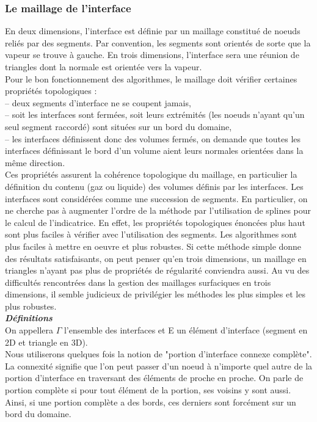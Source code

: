 \subsubsection{Le maillage de l'interface}
En deux dimensions, l’interface est d\'efinie par un maillage constitu\'e de noeuds reli\'es par des segments. Par convention, les segments sont orient\'es de sorte que la vapeur se trouve \`a gauche. En trois dimensions, l’interface sera une r\'eunion de triangles dont la normale est orient\'ee vers la vapeur.\\
Pour le bon fonctionnement des algorithmes, le maillage doit v\'erifier certaines propri\'et\'es topologiques :\\
– deux segments d’interface ne se coupent jamais,\\
– soit les interfaces sont ferm\'ees, soit leurs extr\'emit\'es (les noeuds n’ayant qu’un seul segment raccord\'e) sont situ\'ees sur un bord du domaine,\\
– les interfaces d\'efinissent donc des volumes ferm\'es, on demande que toutes les interfaces d\'efinissant le bord d’un volume aient leurs normales orient\'ees dans la même direction.\\
Ces propri\'et\'es assurent la coh\'erence topologique du maillage, en particulier la d\'efinition du contenu (gaz ou liquide) des volumes d\'efinis par les interfaces. Les interfaces sont consid\'er\'ees comme une succession de segments. En particulier, on ne cherche pas \`a augmenter l’ordre de la m\'ethode par l’utilisation de splines pour le calcul de l’indicatrice. En effet, les propri\'et\'es topologiques \'enonc\'ees plus haut sont plus faciles à v\'erifier avec l’utilisation des segments. Les algorithmes sont plus faciles à mettre en oeuvre et plus robustes. Si cette m\'ethode simple donne des r\'esultats satisfaisants, on peut penser qu’en trois dimensions, un maillage en triangles n’ayant pas plus de propri\'et\'es de r\'egularit\'e conviendra aussi. Au vu des difficult\'es rencontr\'ees dans la gestion des maillages surfaciques en trois dimensions, il semble judicieux de privil\'egier les m\'ethodes les plus simples et les plus robustes.\smallskip \\

\textit{\textbf{D\'efinitions}}\smallskip \\

On appellera $\Gamma$ l’ensemble des interfaces et E un \'el\'ement d’interface (segment en 2D et triangle en 3D).\\
Nous utiliserons quelques fois la notion de "portion d’interface connexe complète". La connexit\'e signifie que l’on peut passer d’un noeud à n’importe quel autre de la portion d’interface en traversant des \'el\'ements de proche en proche. On parle de portion compl\`ete si pour tout \'el\'ement de la portion, ses voisins y sont aussi. Ainsi, si une portion compl\`ete a des bords, ces derniers sont forc\'ement sur un bord du domaine.

